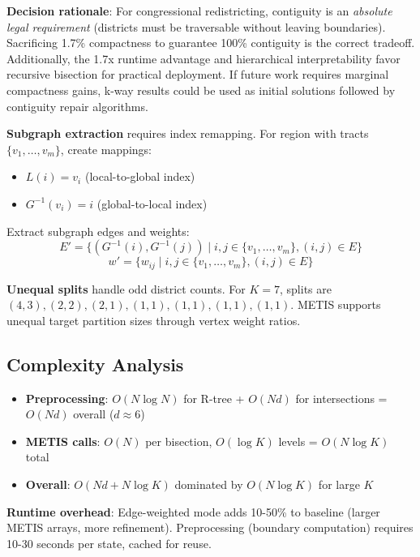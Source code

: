 \textbf{Decision rationale}: For congressional redistricting, contiguity is an \textit{absolute legal requirement} (districts must be traversable without leaving boundaries). Sacrificing 1.7\% compactness to guarantee 100\% contiguity is the correct tradeoff. Additionally, the 1.7x runtime advantage and hierarchical interpretability favor recursive bisection for practical deployment. If future work requires marginal compactness gains, k-way results could be used as initial solutions followed by contiguity repair algorithms.

\textbf{Subgraph extraction} requires index remapping. For region with tracts $\{v_1, \ldots, v_m\}$, create mappings:
\begin{itemize}
    \item $L(i) = v_i$ (local-to-global index)
    \item $G^{-1}(v_i) = i$ (global-to-local index)
\end{itemize}

Extract subgraph edges and weights:
\begin{equation}
    E' = \{(G^{-1}(i), G^{-1}(j)) \mid i,j \in \{v_1, \ldots, v_m\}, (i,j) \in E\}
\end{equation}
\begin{equation}
    w' = \{w_{ij} \mid i,j \in \{v_1, \ldots, v_m\}, (i,j) \in E\}
\end{equation}

\textbf{Unequal splits} handle odd district counts. For $K = 7$, splits are $(4,3), (2,2), (2,1), (1,1), (1,1), (1,1), (1,1)$. METIS supports unequal target partition sizes through vertex weight ratios.

\subsection{Complexity Analysis}

\begin{itemize}
    \item \textbf{Preprocessing}: $O(N \log N)$ for R-tree + $O(Nd)$ for intersections = $O(Nd)$ overall ($d \approx 6$)
    \item \textbf{METIS calls}: $O(N)$ per bisection, $O(\log K)$ levels = $O(N \log K)$ total
    \item \textbf{Overall}: $O(Nd + N \log K)$ dominated by $O(N \log K)$ for large $K$
\end{itemize}

\textbf{Runtime overhead}: Edge-weighted mode adds 10-50\% to baseline (larger METIS arrays, more refinement). Preprocessing (boundary computation) requires 10-30 seconds per state, cached for reuse.

